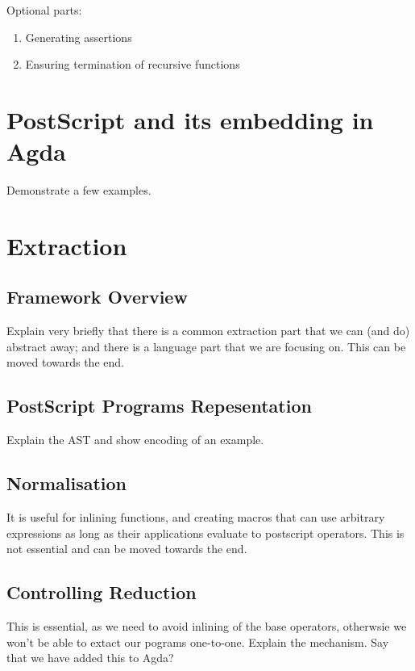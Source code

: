 \documentclass[sigplan,anonymous,review]{acmart}
\begin{document}
Optional parts:
\begin{enumerate}
    \item Generating assertions
    \item Ensuring termination of recursive functions
\end{enumerate}



\section{PostScript and its embedding in Agda}
Demonstrate a few examples.

\section{Extraction}
\subsection{Framework Overview}
Explain very briefly that there is a common extraction part that we can (and do)
abstract away; and there is a language part that we are focusing on.  This can be
moved towards the end.

\subsection{PostScript Programs Repesentation}
Explain the AST and show encoding of an example.

\subsection{Normalisation} \label{sec:normalisation}
It is useful for inlining functions, and creating macros that can use arbitrary expressions
as long as their applications evaluate to postscript operators.
This is not essential and can be moved towards the end.

\subsection{Controlling Reduction} \label{sec:controlling-reduction}
This is essential, as we need to avoid inlining of the base operators, otherwsie
we won't be able to extact our pograms one-to-one.  Explain the mechanism.  Say that we have
added this to Agda?
\end{document}
